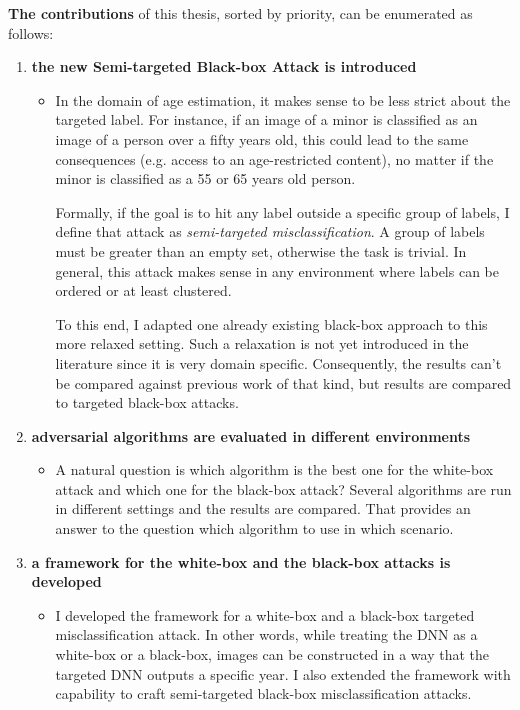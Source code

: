 \textbf{The contributions} of this thesis, sorted by priority, can be enumerated as follows:
\begin{enumerate}

\item \textbf{the new Semi-targeted Black-box Attack is introduced}
	\begin{itemize}
	\item In the domain of age estimation, it makes sense to be less strict about the targeted label. For instance, if an image of a minor is classified as an image of a person over a fifty years old, this could lead to the same consequences (e.g. access to an age-restricted content), no matter if the minor is classified as a 55 or 65 years old person. 
	
	Formally, if the goal is to hit any label outside a specific group of labels, I define that attack as \textit{semi-targeted misclassification}. A group of labels must be greater than an empty set, otherwise the task is trivial. In general, this attack makes sense in any environment where labels can be ordered or at least clustered.

To this end, I adapted one already existing black-box approach to this more relaxed setting. Such a relaxation is not yet introduced in the literature since it is very domain specific. Consequently, the results can't be compared against previous work of that kind, but results are compared to targeted black-box attacks.
	\end{itemize}
	
\item \textbf{adversarial algorithms are evaluated in different environments}
	\begin{itemize}
		\item A natural question is which algorithm is the best one for the white-box attack and which one for the black-box attack? Several algorithms are run in  different settings and the results are compared. That provides an answer to the question which algorithm to use in which scenario.
	\end{itemize}

\item \textbf{a framework for the white-box and the black-box attacks is developed}
	\begin{itemize}
	\item I developed the framework for a white-box and a black-box targeted misclassification attack. In other words, while treating the DNN as a white-box or a black-box, images can be constructed in a way that the targeted DNN outputs a specific year. I also extended the framework with capability to craft semi-targeted black-box misclassification attacks.
	\end{itemize}
\end{enumerate}

